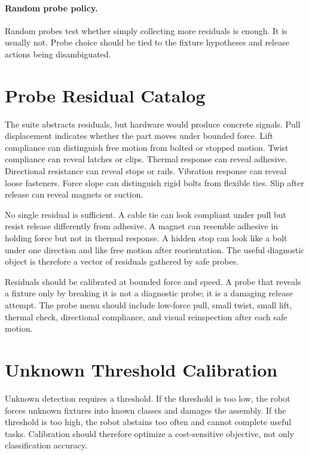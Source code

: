 \documentclass{article}
\begin{document}
\paragraph{Random probe policy.}
Random probes test whether simply collecting more residuals is enough. It is
usually not. Probe choice should be tied to the fixture hypotheses and release
actions being disambiguated.

\section{Probe Residual Catalog}

The suite abstracts residuals, but hardware would produce concrete signals.
Pull displacement indicates whether the part moves under bounded force. Lift
compliance can distinguish free motion from bolted or stopped motion. Twist
compliance can reveal latches or clips. Thermal response can reveal adhesive.
Directional resistance can reveal stops or rails. Vibration response can reveal
loose fasteners. Force slope can distinguish rigid bolts from flexible ties.
Slip after release can reveal magnets or suction.

No single residual is sufficient. A cable tie can look compliant under pull
but resist release differently from adhesive. A magnet can resemble adhesive in
holding force but not in thermal response. A hidden stop can look like a bolt
under one direction and like free motion after reorientation. The useful
diagnostic object is therefore a vector of residuals gathered by safe probes.

Residuals should be calibrated at bounded force and speed. A probe that
reveals a fixture only by breaking it is not a diagnostic probe; it is a
damaging release attempt. The probe menu should include low-force pull, small
twist, small lift, thermal check, directional compliance, and visual
reinspection after each safe motion.

\section{Unknown Threshold Calibration}

Unknown detection requires a threshold. If the threshold is too low, the robot
forces unknown fixtures into known classes and damages the assembly. If the
threshold is too high, the robot abstains too often and cannot complete useful
tasks. Calibration should therefore optimize a cost-sensitive objective, not
only classification accuracy.
\end{document}
